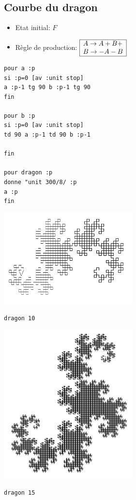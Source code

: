 \subsection{Courbe du dragon}
\begin{itemize}
 \item[\textbullet] Etat initial: $F$\\
 \item[\textbullet] Règle de production: $\begin{array}{|l|}
\hline
A\rightarrow A+B+ \\
B\rightarrow -A-B \\
\hline
\end{array}$ 
\end{itemize}
\begin{verbatim}
pour a :p
si :p=0 [av :unit stop]
a :p-1 tg 90 b :p-1 tg 90
fin

pour b :p
si :p=0 [av :unit stop]
td 90 a :p-1 td 90 b :p-1

fin

pour dragon :p
donne "unit 300/8/ :p  
a :p
fin
\end{verbatim}
\begin{center}
 \begin{minipage}{7cm}
 \includegraphics[width=7cm]{images/linden-dragon10.png}
 \begin{center}
  \texttt{dragon 10}
 \end{center}
\end{minipage}
 \begin{minipage}{7cm}
 \includegraphics[width=7cm]{images/linden-dragon15.png}
 \begin{center}
  \texttt{dragon 15}
 \end{center}
\end{minipage}
\end{center}

